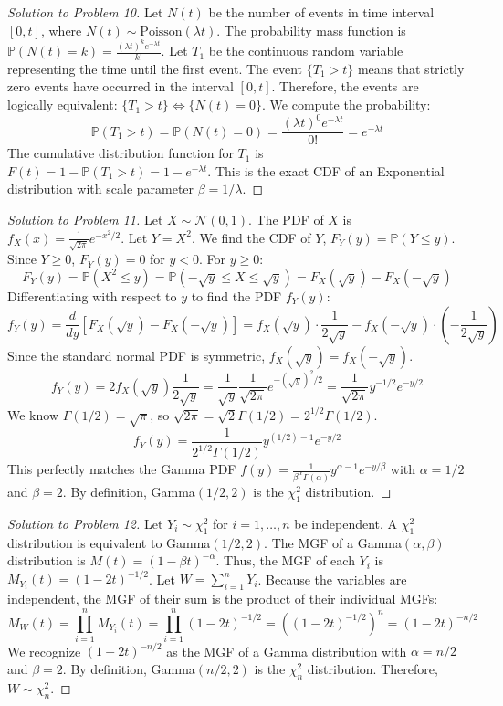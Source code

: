\documentclass[11pt, a4paper]{article}
\theoremstyle{definition}
\theoremstyle{remark}
\newcommand{\Prob}{\mathbb{P}}
\begin{document}
\begin{proof}[Solution to Problem 10]
Let $N(t)$ be the number of events in time interval $[0, t]$, where $N(t) \sim \text{Poisson}(\lambda t)$. The probability mass function is $\Prob(N(t) = k) = \frac{(\lambda t)^k e^{-\lambda t}}{k!}$.
Let $T_1$ be the continuous random variable representing the time until the first event.
The event $\{T_1 > t\}$ means that strictly zero events have occurred in the interval $[0, t]$.
Therefore, the events are logically equivalent: $\{T_1 > t\} \iff \{N(t) = 0\}$.
We compute the probability:
\[ \Prob(T_1 > t) = \Prob(N(t) = 0) = \frac{(\lambda t)^0 e^{-\lambda t}}{0!} = e^{-\lambda t} \]
The cumulative distribution function for $T_1$ is $F(t) = 1 - \Prob(T_1 > t) = 1 - e^{-\lambda t}$.
This is the exact CDF of an Exponential distribution with scale parameter $\beta = 1/\lambda$.
\end{proof}

\begin{proof}[Solution to Problem 11]
Let $X \sim \mathcal{N}(0,1)$. The PDF of $X$ is $f_X(x) = \frac{1}{\sqrt{2\pi}} e^{-x^2/2}$.
Let $Y = X^2$. We find the CDF of $Y$, $F_Y(y) = \Prob(Y \le y)$. Since $Y \ge 0$, $F_Y(y) = 0$ for $y < 0$. For $y \ge 0$:
\[ F_Y(y) = \Prob(X^2 \le y) = \Prob(-\sqrt{y} \le X \le \sqrt{y}) = F_X(\sqrt{y}) - F_X(-\sqrt{y}) \]
Differentiating with respect to $y$ to find the PDF $f_Y(y)$:
\[ f_Y(y) = \frac{d}{dy} \left[ F_X(\sqrt{y}) - F_X(-\sqrt{y}) \right] = f_X(\sqrt{y}) \cdot \frac{1}{2\sqrt{y}} - f_X(-\sqrt{y}) \cdot \left( -\frac{1}{2\sqrt{y}} \right) \]
Since the standard normal PDF is symmetric, $f_X(\sqrt{y}) = f_X(-\sqrt{y})$.
\[ f_Y(y) = 2 f_X(\sqrt{y}) \frac{1}{2\sqrt{y}} = \frac{1}{\sqrt{y}} \frac{1}{\sqrt{2\pi}} e^{-(\sqrt{y})^2/2} = \frac{1}{\sqrt{2\pi}} y^{-1/2} e^{-y/2} \]
We know $\Gamma(1/2) = \sqrt{\pi}$, so $\sqrt{2\pi} = \sqrt{2}\Gamma(1/2) = 2^{1/2}\Gamma(1/2)$.
\[ f_Y(y) = \frac{1}{2^{1/2}\Gamma(1/2)} y^{(1/2)-1} e^{-y/2} \]
This perfectly matches the Gamma PDF $f(y) = \frac{1}{\beta^\alpha \Gamma(\alpha)} y^{\alpha-1} e^{-y/\beta}$ with $\alpha = 1/2$ and $\beta = 2$. By definition, Gamma$(1/2, 2)$ is the $\chi^2_1$ distribution.
\end{proof}

\begin{proof}[Solution to Problem 12]
Let $Y_i \sim \chi^2_1$ for $i = 1, \dots, n$ be independent. A $\chi^2_1$ distribution is equivalent to Gamma$(1/2, 2)$.
The MGF of a Gamma$(\alpha, \beta)$ distribution is $M(t) = (1 - \beta t)^{-\alpha}$.
Thus, the MGF of each $Y_i$ is $M_{Y_i}(t) = (1 - 2t)^{-1/2}$.
Let $W = \sum_{i=1}^n Y_i$. Because the variables are independent, the MGF of their sum is the product of their individual MGFs:
\[ M_W(t) = \prod_{i=1}^n M_{Y_i}(t) = \prod_{i=1}^n (1 - 2t)^{-1/2} = \left( (1 - 2t)^{-1/2} \right)^n = (1 - 2t)^{-n/2} \]
We recognize $(1 - 2t)^{-n/2}$ as the MGF of a Gamma distribution with $\alpha = n/2$ and $\beta = 2$. By definition, Gamma$(n/2, 2)$ is the $\chi^2_n$ distribution. Therefore, $W \sim \chi^2_n$.
\end{proof}
\end{document}
